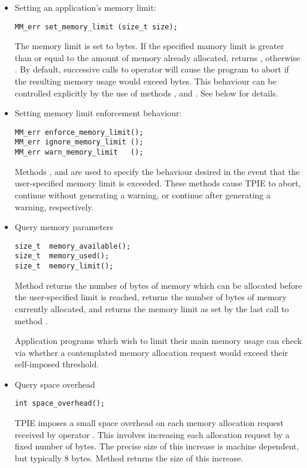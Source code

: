 \begin{itemize}
\item Setting an application's memory limit:
\begin{verbatim}
MM_err set_memory_limit (size_t size);
\end{verbatim}

The memory limit is set to  bytes. If the
specified mamory limit is greater than or equal to the
amount of memory already allocated, 
returns , otherwise
. By default, successive
calls to operator  will cause the program to abort
if the resulting memory usage would exceed 
bytes. This behaviour can be controlled explicitly by the
use of methods ,
 and .
See below for details.

\item Setting memory limit enforcement behaviour:
\begin{verbatim}
MM_err enforce_memory_limit();
MM_err ignore_memory_limit ();
MM_err warn_memory_limit   ();
\end{verbatim}

Methods ,
 and
 are used to specify the
behaviour desired in the event that the user-specified
memory limit is exceeded. These methods cause TPIE to abort,
continue without generating a warning, or continue after
generating a warning, respectively.

\item Query memory parameters

\begin{verbatim}
size_t  memory_available();
size_t  memory_used();
size_t  memory_limit();
\end{verbatim}

Method  returns the number of bytes
of memory which can be allocated before the user-specified
limit is reached,  returns the number of
bytes of memory currently allocated, and 
returns the memory limit as set by the last call to method
.

Application programs which wish to limit their main memory
usage can check via  whether a
contemplated memory allocation request would exceed their
self-imposed threshold.

\item Query space overhead

\begin{verbatim}
int space_overhead();
\end{verbatim}

TPIE imposes a small space overhead on each memory
allocation request received by operator . This involves
increasing each allocation request by a fixed number of
bytes. The precise size of this increase is machine
dependent, but typically 8 bytes. Method 
returns the size of this increase.
\end{itemize}

